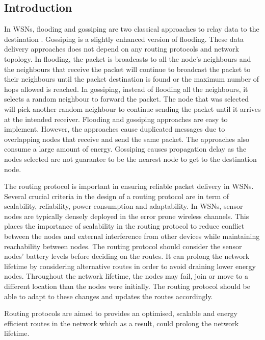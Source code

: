 \subsection{Introduction}
In WSNs, flooding and gossiping are two classical approaches to relay data to the destination \cite{akkaya2005survey}. Gossiping is a slightly enhanced version of flooding. These data delivery approaches does not depend on any routing protocols and network topology. In flooding, the packet is broadcasts to all the node's neighbours and the neighbours that receive the packet will continue to broadcast the packet to their neighbours until the packet destination is found or the maximum number of hops allowed is reached. In gossiping, instead of flooding all the neighbours, it selects a random neighbour to forward the packet. The node that was selected will pick another random neighbour to continue sending the packet until it arrives at the intended receiver. Flooding and gossiping approaches are easy to implement. However, the approaches cause duplicated messages due to overlapping nodes that receive and send the same packet. The approaches also consume a large amount of energy. Gossiping causes propagation delay as the nodes selected are not guarantee to be the nearest node to get to the destination node.

The routing protocol is important in ensuring reliable packet delivery in WSNs. Several crucial criteria in the design of a routing protocol are in term of scalability, reliability, power consumption and adaptability. In WSNs, sensor nodes are typically densely deployed in the error prone wireless channels. This places the importance of scalability in the routing protocol to reduce conflict between the nodes and external interference from other devices while maintaining reachability between nodes. The routing protocol should consider the sensor nodes' battery levels before deciding on the routes. It can prolong the network lifetime by considering alternative routes in order to avoid draining lower energy nodes. Throughout the network lifetime, the nodes may fail, join or move to a different location than the nodes were initially. The routing protocol should be able to adapt to these changes and updates the routes accordingly.

Routing protocols are aimed to provides an optimised, scalable and energy efficient routes in the network which as a result, could prolong the network lifetime.


